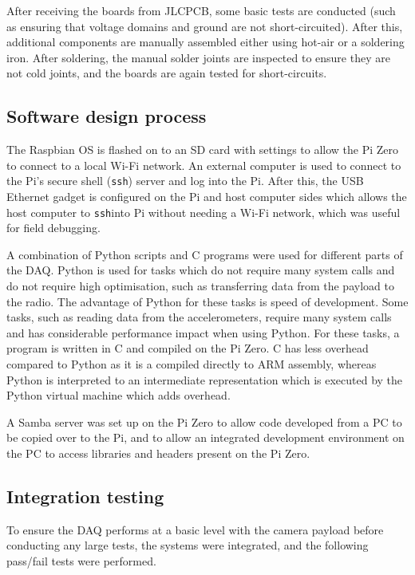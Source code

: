 \documentclass[]{report}
\newcommand{\ssh}{\texttt{ssh}}
\begin{document}
After receiving the boards from JLCPCB, some basic tests are conducted (such as ensuring that voltage domains and ground are not short-circuited). After this, additional components are manually assembled either using hot-air or a soldering iron. After soldering, the manual solder joints are inspected to ensure they are not cold joints, and the boards are again tested for short-circuits.

\subsection{Software design process}

The Raspbian OS is flashed on to an SD card with settings to allow the Pi Zero to connect to a local Wi-Fi network. An external computer is used to connect to the Pi's secure shell (\ssh) server and log into the Pi. After this, the USB Ethernet gadget is configured on the Pi and host computer sides which allows the host computer to \ssh into Pi without needing a Wi-Fi network, which was useful for field debugging.

A combination of Python scripts and C programs were used for different parts of the DAQ. Python is used for tasks which do not require many system calls and do not require high optimisation, such as transferring data from the payload to the radio. The advantage of Python for these tasks is speed of development.  Some tasks, such as reading data from the accelerometers, require many system calls and has considerable performance impact when using Python. For these tasks, a program is written in C and compiled on the Pi Zero. C has less overhead compared to Python as it is a compiled directly to ARM assembly, whereas Python is interpreted to an intermediate representation which is executed by the Python virtual machine which adds overhead.

A Samba server was set up on the Pi Zero to allow code developed from a PC to be copied over to the Pi, and to allow an integrated development environment on the PC to access libraries and headers present on the Pi Zero.

\subsection{Integration testing}

To ensure the DAQ performs at a basic level with the camera payload before conducting any large tests, the systems were integrated, and the following pass/fail tests were performed.
\end{document}

